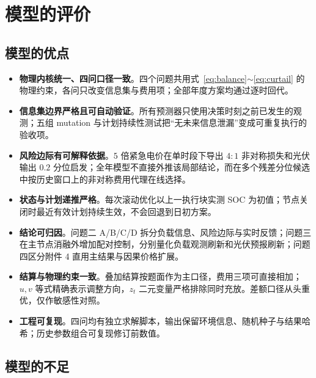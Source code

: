 \section{模型的评价}

\subsection{模型的优点}

\begin{itemize}[itemsep=2pt, topsep=3pt]
	\item \textbf{物理内核统一、四问口径一致}。四个问题共用式~\eqref{eq:balance}$\sim$\eqref{eq:curtail} 的物理约束，各问只改变信息集与费用项；全部年度方案均通过逐时回代。
	\item \textbf{信息集边界严格且可自动验证}。所有预测器只使用决策时刻之前已发生的观测；五组 mutation 与计划持续性测试把“无未来信息泄漏”变成可重复执行的验收项。
	\item \textbf{风险边际有可解释依据}。$5$ 倍紧急电价在单时段下导出 $4:1$ 非对称损失和光伏输出 $0.2$ 分位启发；全年模型不直接外推该局部结论，而在多个残差分位候选中按历史窗口上的非对称费用代理在线选择。
	\item \textbf{状态与计划递推严格}。每次滚动优化以上一执行块实测 SOC 为初值；节点关闭时最近有效计划持续生效，不会回退到日初方案。
	\item \textbf{结论可归因}。问题二 A/B/C/D 拆分负载信息、风险边际与实时反馈；问题三在主节点消融外增加配对控制，分别量化负载观测刷新和光伏预报刷新；问题四区分附件 4 直用主结果与因果价格扩展。
	\item \textbf{结算与物理约束一致}。叠加结算按题面作为主口径，费用三项可直接相加；$u,v$ 等式精确表示调整方向，$z_t$ 二元变量严格排除同时充放。差额口径从头重优，仅作敏感性对照。
	\item \textbf{工程可复现}。四问均有独立求解脚本，输出保留环境信息、随机种子与结果哈希；历史参数组合可复现修订前数值。
\end{itemize}

\subsection{模型的不足}

